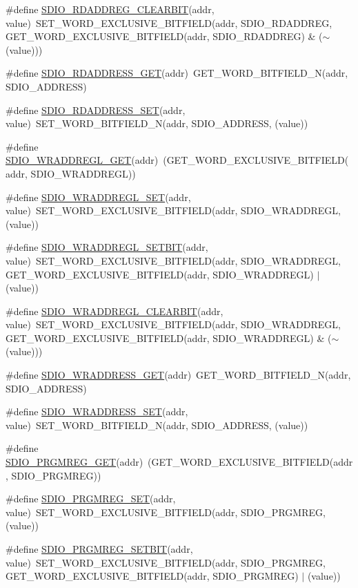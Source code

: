 \begin{DoxyCompactItemize}
\item 
\#define \hyperlink{a00570_adf003fc64a6417fed2a6a6753128dfe6}{SDIO\_\-RDADDREG\_\-CLEARBIT}(addr, value)~SET\_\-WORD\_\-EXCLUSIVE\_\-BITFIELD(addr, SDIO\_\-RDADDREG, GET\_\-WORD\_\-EXCLUSIVE\_\-BITFIELD(addr, SDIO\_\-RDADDREG) \& ($\sim$(value)))
\item 
\#define \hyperlink{a00570_a0dc88fce8bcfbfc8affc446ebb7905e8}{SDIO\_\-RDADDRESS\_\-GET}(addr)~GET\_\-WORD\_\-BITFIELD\_\-N(addr, SDIO\_\-ADDRESS)
\item 
\#define \hyperlink{a00570_aec52f8f18b2cefbf09adf438ccb5f1b2}{SDIO\_\-RDADDRESS\_\-SET}(addr, value)~SET\_\-WORD\_\-BITFIELD\_\-N(addr, SDIO\_\-ADDRESS, (value))
\item 
\#define \hyperlink{a00570_aedc9c84a822a595d5f1c6f4facb72139}{SDIO\_\-WRADDREGL\_\-GET}(addr)~(GET\_\-WORD\_\-EXCLUSIVE\_\-BITFIELD(addr, SDIO\_\-WRADDREGL))
\item 
\#define \hyperlink{a00570_a112da1534feace192a8d143dd135a2c9}{SDIO\_\-WRADDREGL\_\-SET}(addr, value)~SET\_\-WORD\_\-EXCLUSIVE\_\-BITFIELD(addr, SDIO\_\-WRADDREGL, (value))
\item 
\#define \hyperlink{a00570_ac7098ea41b526e2998bcd12e1519453e}{SDIO\_\-WRADDREGL\_\-SETBIT}(addr, value)~SET\_\-WORD\_\-EXCLUSIVE\_\-BITFIELD(addr, SDIO\_\-WRADDREGL, GET\_\-WORD\_\-EXCLUSIVE\_\-BITFIELD(addr, SDIO\_\-WRADDREGL) $|$ (value))
\item 
\#define \hyperlink{a00570_a3d0e22367b82c26863f76369782e9552}{SDIO\_\-WRADDREGL\_\-CLEARBIT}(addr, value)~SET\_\-WORD\_\-EXCLUSIVE\_\-BITFIELD(addr, SDIO\_\-WRADDREGL, GET\_\-WORD\_\-EXCLUSIVE\_\-BITFIELD(addr, SDIO\_\-WRADDREGL) \& ($\sim$(value)))
\item 
\#define \hyperlink{a00570_afbfa39c4a662c6b3e5594fdeb71a1651}{SDIO\_\-WRADDRESS\_\-GET}(addr)~GET\_\-WORD\_\-BITFIELD\_\-N(addr, SDIO\_\-ADDRESS)
\item 
\#define \hyperlink{a00570_a6703bc8e0000dcd6eafd09aa15cc8a64}{SDIO\_\-WRADDRESS\_\-SET}(addr, value)~SET\_\-WORD\_\-BITFIELD\_\-N(addr, SDIO\_\-ADDRESS, (value))
\item 
\#define \hyperlink{a00570_aaf78ff11a13c7eac61ce91c6f010d656}{SDIO\_\-PRGMREG\_\-GET}(addr)~(GET\_\-WORD\_\-EXCLUSIVE\_\-BITFIELD(addr, SDIO\_\-PRGMREG))
\item 
\#define \hyperlink{a00570_adbad3f2b96f6bfec2d832cfa7919586f}{SDIO\_\-PRGMREG\_\-SET}(addr, value)~SET\_\-WORD\_\-EXCLUSIVE\_\-BITFIELD(addr, SDIO\_\-PRGMREG, (value))
\item 
\#define \hyperlink{a00570_ab6580f90ead1a9fcac3a9ee29ebcf3ee}{SDIO\_\-PRGMREG\_\-SETBIT}(addr, value)~SET\_\-WORD\_\-EXCLUSIVE\_\-BITFIELD(addr, SDIO\_\-PRGMREG, GET\_\-WORD\_\-EXCLUSIVE\_\-BITFIELD(addr, SDIO\_\-PRGMREG) $|$ (value))

\end{DoxyCompactItemize}
